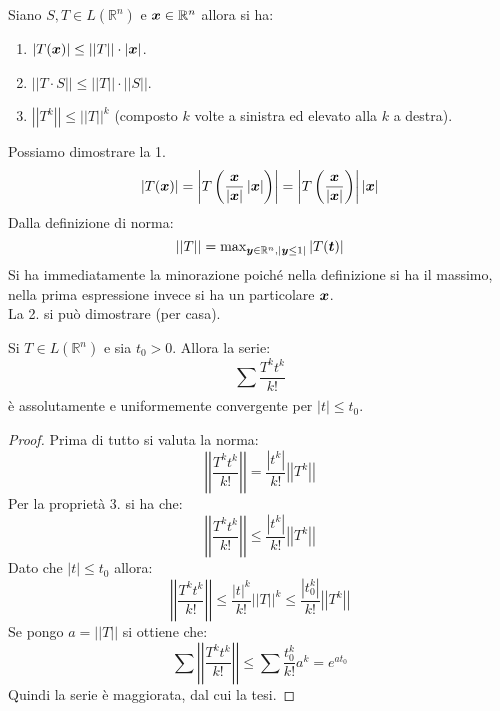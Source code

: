 \noindent
\begin{thm}
    Siano $S, T \in L(\mathbb{R}^n)$ e $\boldsymbol{x}\in \mathbb{R}^n$ allora si ha:
    \begin{enumerate}
	\item $\left|T(\boldsymbol{x})\right|\le \left|\left|T\right|\right|\cdot \left|\boldsymbol{x}\right|$.
	\item $\left|\left|T \cdot S\right|\right|\le \left|\left|T\right|\right|\cdot \left|\left|S\right|\right|$.
	\item $\left|\left|T^k\right|\right| \le \left|\left|T\right|\right|^k$ (composto $k$ volte a sinistra ed elevato alla $k$ a destra).
    \end{enumerate}
\end{thm}
\noindent
Possiamo dimostrare la 1.
\[
    \left|T(\boldsymbol{x})\right|= \left|T\left(\frac{\boldsymbol{x}}{\left|\boldsymbol{x}\right|}\left|\boldsymbol{x}\right|\right)\right|=
    \left|T\left(\frac{\boldsymbol{x}}{\left|\boldsymbol{x}\right|}\right)\right|\left|\boldsymbol{x}\right|
\] 
Dalla definizione di norma:
\[
    \left|\left|T\right|\right| = \text{max}_{\boldsymbol{y}\in \mathbb{R}^n, \left|\boldsymbol{y}\le 1\right|}\left|T(\boldsymbol{t})\right|
\] 
Si ha immediatamente la minorazione poiché nella definizione si ha il massimo, nella prima espressione invece si ha un particolare $\boldsymbol{x}$.\\
La 2. si può dimostrare (per casa). 
\begin{thm}
    Si $T\in L(\mathbb{R}^n)$ e sia $t_0>0$. Allora la serie:
    \[
        \sum_{}^{} \frac{T^{k}t^k}{k!}
    \] è assolutamente e uniformemente convergente per $\left|t\right|\le t_0$.
\end{thm}
\noindent
\begin{proof}
    Prima di tutto si valuta la norma:
    \[
        \left|\left|\frac{T^kt^k}{k!}\right|\right| = \frac{\left|t^k\right|}{k!}\left|\left|T^k\right|\right|
    \] Per la proprietà 3. si ha che:
    \[
        \left|\left|\frac{T^kt^k}{k!}\right|\right|  \le \frac{\left|t^k\right|}{k!}\left|\left|T^k\right|\right|
    \] 
    Dato che $\left|t\right|\le t_0$ allora:
    \[
        \left|\left|\frac{T^kt^k}{k!}\right|\right| \le \frac{\left|t\right|^k}{k!}\left|\left|T\right|\right|^{k}\le \frac{\left|t_0^k\right|}{k!}
	\left|\left|T^k\right|\right|
    \] 
    Se pongo $a= \left|\left|T\right|\right|$ si ottiene che:
    \[
        \sum_{}^{} \left|\left|\frac{T^kt^k}{k!}\right|\right|\le \sum_{}^{} \frac{t_0^k}{k!}a^k = 
	e^{at_0}
    \] 
    Quindi la serie è maggiorata, dal cui la tesi.
\end{proof}
